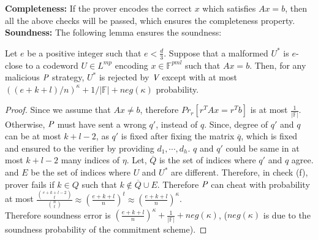 \textbf{Completeness:} If the prover encodes the correct $x$ which satisfies $Ax=b$, then all the above checks will be passed, which ensures the completeness property.\\

\textbf{Soundness:} The following lemma ensures the soundness:

\begin{lemma}
	Let $e$ be a positive integer such that $e < \frac{d}{3}$. Suppose that a malformed $U^*$ is $e$-close to a codeword $U\in L^{mp}$ encoding $x\in \mathbb{F}^{pml}$ such that $Ax=b$. Then, for any malicious $\P$ strategy, $U^*$ is rejected by $\V$ except with at most $((e +k +l)/n)^{\kappa} +1/|\mathbb{F}|+neg(\kappa)$ probability.
\end{lemma}

\begin{proof}
	Since we assume that $Ax\neq b$, therefore $Pr_r[r^TAx=r^Tb]$ is at most $\frac{1}{|\mathbb{F}|}$.\\
	 Otherwise, $\P$ must have sent a wrong $q'$, instead of $q$. Since, degree of $q'$ and $q$ can be at most $k+l-2$, as $q'$ is fixed after fixing the matrix $\overline{q}$, which is fixed and ensured to the verifier by providing $d_1,\cdots, d_h$. $q$ and $q'$ could be same in at most $k+l-2$ many indices of $\eta$. Let, $\overline{Q}$ is the set of indices where $q'$ and $q$ agree. and $E$ be the set of indices where $U$ and $U^*$ are different. Therefore, in check (f), prover fails if $k\in Q$ such that $k\notin \overline{Q}\cup E$. Therefore $\P$ can cheat with probability at most $\frac{\binom{e+k+l-2}{t}}{\binom{n}{t}}\approx (\frac{e+k+l}{n})^t\approx (\frac{e+k+l}{n})^{\kappa}$.\\
	 Therefore soundness error is $(\frac{e+k+l}{n})^{\kappa}+\frac{1}{|\mathbb{F}|}+neg(\kappa)$, ($neg(\kappa)$ is due to the soundness probability of the commitment scheme).
\end{proof}


